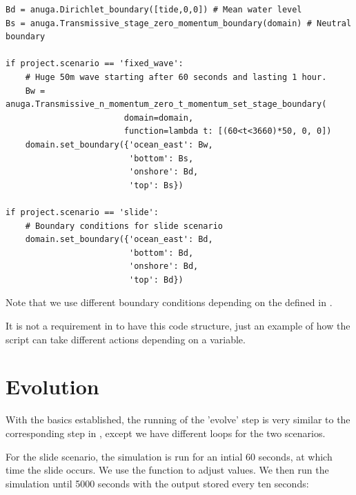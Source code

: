 \documentclass{manual}
\begin{document}
\begin{verbatim}
Bd = anuga.Dirichlet_boundary([tide,0,0]) # Mean water level
Bs = anuga.Transmissive_stage_zero_momentum_boundary(domain) # Neutral boundary

if project.scenario == 'fixed_wave':
    # Huge 50m wave starting after 60 seconds and lasting 1 hour.
    Bw = anuga.Transmissive_n_momentum_zero_t_momentum_set_stage_boundary(
                        domain=domain, 
                        function=lambda t: [(60<t<3660)*50, 0, 0])
    domain.set_boundary({'ocean_east': Bw,
                         'bottom': Bs,
                         'onshore': Bd,
                         'top': Bs})

if project.scenario == 'slide':
    # Boundary conditions for slide scenario
    domain.set_boundary({'ocean_east': Bd,
                         'bottom': Bd,
                         'onshore': Bd,
                         'top': Bd})
\end{verbatim}

Note that we use different boundary conditions depending on the 
defined in .

It is not a requirement in \anuga to have this code structure, just an example of
how the script can take different actions depending on a variable.

\section{Evolution}

With the basics established, the running of the 'evolve' step is
very similar to the corresponding step in , except we have different 
loops for the two scenarios.

For the slide scenario, the simulation is run for an intial 60 seconds, at which time
the slide occurs.  We use the function  to adjust 
values.  We then run the simulation until 5000 seconds with the output stored
every ten seconds:
\end{document}
